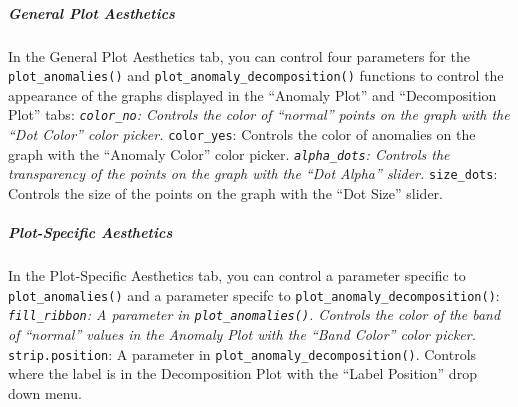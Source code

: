\documentclass[]{article}
\let\oldsubparagraph\subparagraph
\renewcommand{\subparagraph}[1]{\oldsubparagraph{#1}\mbox{}}
\begin{document}
\subparagraph{General Plot Aesthetics}\label{general-plot-aesthetics}

In the General Plot Aesthetics tab, you can control four parameters for
the \texttt{plot\_anomalies()} and
\texttt{plot\_anomaly\_decomposition()} functions to control the
appearance of the graphs displayed in the ``Anomaly Plot'' and
``Decomposition Plot'' tabs: \emph{\texttt{color\_no}: Controls the
color of ``normal'' points on the graph with the ``Dot Color'' color
picker. }\texttt{color\_yes}: Controls the color of anomalies on the
graph with the ``Anomaly Color'' color picker.
\emph{\texttt{alpha\_dots}: Controls the transparency of the points on
the graph with the ``Dot Alpha'' slider. }\texttt{size\_dots}: Controls
the size of the points on the graph with the ``Dot Size'' slider.

\subparagraph{Plot-Specific Aesthetics}\label{plot-specific-aesthetics}

In the Plot-Specific Aesthetics tab, you can control a parameter
specific to \texttt{plot\_anomalies()} and a parameter specifc to
\texttt{plot\_anomaly\_decomposition()}: \emph{\texttt{fill\_ribbon}: A
parameter in \texttt{plot\_anomalies()}. Controls the color of the band
of ``normal'' values in the Anomaly Plot with the ``Band Color'' color
picker. }\texttt{strip.position}: A parameter in
\texttt{plot\_anomaly\_decomposition()}. Controls where the label is in
the Decomposition Plot with the ``Label Position'' drop down menu.
\end{document}
